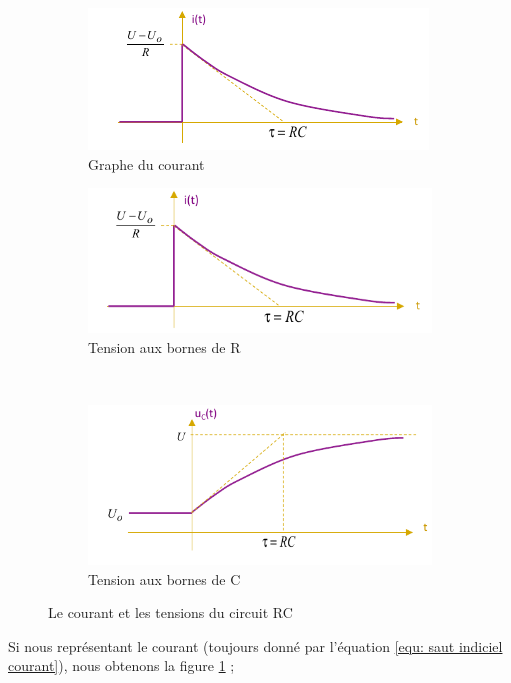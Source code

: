 \documentclass[12pt,a4paper]{article}
\begin{document}
\begin{figure}
	\centering
	\begin{subfigure}[b]{0.45\textwidth}
		\centering
		\includegraphics[scale=0.75]{images/courant_rc}
		\caption{Graphe du courant}
		\label{subfig: courant rc}
	\end{subfigure}
	\begin{subfigure}[b]{0.45\textwidth}
		\centering
		\includegraphics[scale=0.5]{images/tension_rc_r}
		\caption{Tension aux bornes de R}
		\label{subfig: tension rc R}
	\end{subfigure}\\
	\begin{subfigure}[b]{0.6\textwidth}
		\centering
		\includegraphics[scale=0.5]{images/tension_rc_c}
		\caption{Tension aux bornes de C}
		\label{subfig: tension rc C}
	\end{subfigure}
	\caption{Le courant et les tensions du circuit RC}
\end{figure}
Si nous représentant le courant (toujours donné par l'équation \ref{equ: saut indiciel courant}), nous obtenons la figure \ref{subfig: courant rc} ; 
\end{document}
